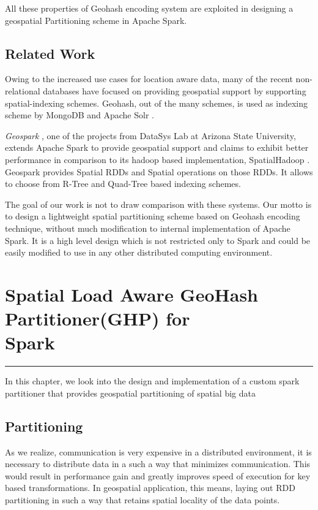 \documentclass[article,type=msc,colorback,12pt,accentcolor=tud1d]{tudthesis}
\begin{document}
		    All these properties of Geohash encoding system are exploited in designing a geospatial Partitioning scheme in Apache Spark. 
		   
		   \clearpage
		   \subsection{Related Work} 
		   
		   Owing to the increased use cases for location aware data, many of the recent non-relational databases have focused on providing geospatial support by supporting spatial-indexing schemes. Geohash, out of the many schemes,  is used as indexing scheme by 
		   MongoDB \cite{MongoDB} and Apache Solr \cite{apachesolr}. 
		   
		   \textit{Geospark }\cite{geospark}, one of the projects from DataSys Lab at Arizona State University, extends Apache Spark to provide geospatial support and claims to exhibit better performance in comparison to its hadoop based implementation, SpatialHadoop \cite{spatialhadoop}. Geospark provides Spatial RDDs and Spatial operations on those RDDs. It allows to choose from R-Tree and Quad-Tree based indexing schemes. 
		   
		   The goal of our work is not to draw comparison with these systems. Our motto is to design a lightweight spatial partitioning scheme based on Geohash encoding technique, without much modification to internal implementation of Apache Spark. It is a high level design which is not restricted only to Spark and could be easily modified to use in any other distributed computing environment. 
		   
		  
     \cleardoublepage
     \hfill
	\section[Spatial Load Aware GeoHash Partitioner(GHP) for Spark]{Spatial Load Aware GeoHash Partitioner(GHP) for \\Spark}
		\hfill \hrule	\hfill 
	In this chapter, we look into the design and implementation of a custom spark partitioner that provides  geospatial partitioning of spatial big data
		\subsection{Partitioning}
			\par As we realize, communication is very expensive in a distributed environment, it is necessary to distribute data in a such a way that minimizes communication. This would result in performance gain and greatly improves speed of execution for key based transformations. In geospatial application, this means, laying out RDD partitioning in such a way that retains spatial locality of the data points. 
			
\end{document}
